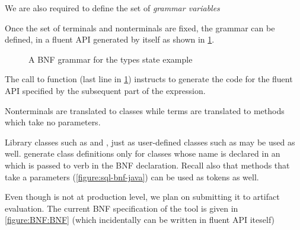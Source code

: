 We are also required to define the set of \emph{grammar variables}
\begin{quote}
\end{quote}

Once the set of terminals and nonterminals are fixed, the grammar can be
defined, in a fluent API generated by \Fajita itself as shown in
\cref{figure:fluent}.

\begin{figure}
  \caption{A BNF grammar for the types state example}
  \label{figure:fluent}
\end{figure}

The call to function  (last line in \cref{figure:fluent}) instructs
\Fajita to generate the code for the fluent API specified by the
subsequent part of the expression.

Nonterminals are translated to classes while terms are translated to methods which
take no parameters.  

Library classes such as  and , just as user-defined
classes such as  may be used as well.  \Fajita generate class
definitions only for classes whose name is declared in an  which is
passed to  verb in the BNF declaration.  Recall also that methods that
take a parameters (\cref{figure:sql-bnf-java}) can be used as tokens as well.

Even though \Fajita is not at production level, we plan on submitting it to 
artifact evaluation. The current BNF specification of the tool is given in
\cref{figure:BNF:BNF} (which incidentally can be written in \Fajita fluent 
API iteself)


